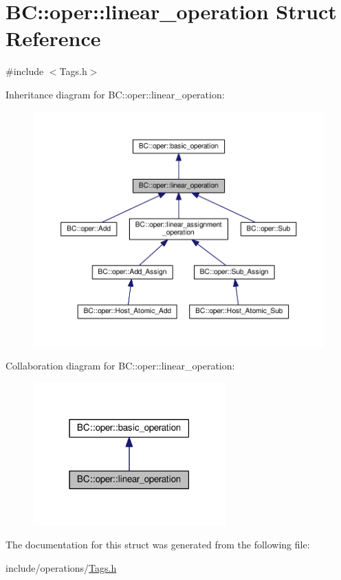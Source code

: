 \hypertarget{structBC_1_1oper_1_1linear__operation}{}\section{BC\+:\+:oper\+:\+:linear\+\_\+operation Struct Reference}
\label{structBC_1_1oper_1_1linear__operation}


{\ttfamily \#include $<$Tags.\+h$>$}



Inheritance diagram for BC\+:\+:oper\+:\+:linear\+\_\+operation\+:
\nopagebreak
\begin{figure}[H]
\begin{center}
\leavevmode
\includegraphics[width=350pt]{structBC_1_1oper_1_1linear__operation__inherit__graph}
\end{center}
\end{figure}


Collaboration diagram for BC\+:\+:oper\+:\+:linear\+\_\+operation\+:
\nopagebreak
\begin{figure}[H]
\begin{center}
\leavevmode
\includegraphics[width=210pt]{structBC_1_1oper_1_1linear__operation__coll__graph}
\end{center}
\end{figure}


The documentation for this struct was generated from the following file\+:\begin{DoxyCompactItemize}
\item 
include/operations/\hyperlink{operations_2Tags_8h}{Tags.\+h}\end{DoxyCompactItemize}
